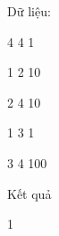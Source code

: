 Dữ liệu:  

   4 4 1   


   1 2 10   


   2 4 10   


   1 3 1   


   3 4 100   




   Kết quả  

   1